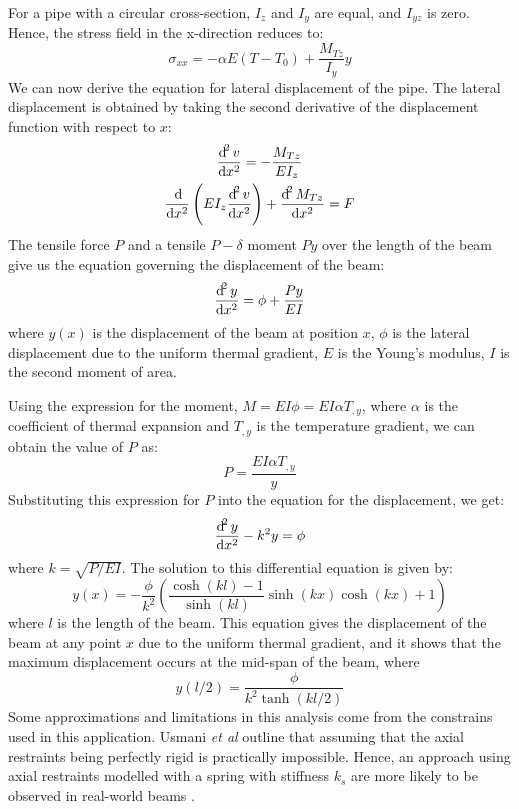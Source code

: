 For a pipe with a circular cross-section, $I_z$ and $I_y$ are equal, and $I_{yz}$ is zero. Hence, the stress field in the x-direction reduces to:
\begin{equation}
    \sigma_{xx} = -\alpha E \left(T - T_0\right) + \frac{M_{Tz}}{I_y}y
\end{equation}
We can now derive the equation for lateral displacement of the pipe. The lateral displacement is obtained by taking the second derivative of the displacement function with respect to $x$:
\begin{gather}
    \frac{\dif^2 v}{\dif x^2} = - \frac{M_{Tz}}{EI_z}\\
    \frac{\dif}{\dif x^2}\left(EI_z\frac{\dif^2 v}{\dif x^2}\right) + \frac{\dif^2 M_{Tz}}{\dif x^2} = F
\end{gather}
The tensile force $P$ and a tensile $P-\delta$ moment $Py$ over the length of the beam give us the equation governing the displacement of the beam:
\begin{equation}
    \frac{\dif^2 y}{\dif x^2} = \phi + \frac{Py}{EI}
\end{equation}
where $y(x)$ is the displacement of the beam at position $x$, $\phi$ is the lateral displacement due to the uniform thermal gradient, $E$ is the Young's modulus, $I$ is the second moment of area.

Using the expression for the moment, $M = EI \phi = EI\alpha T_{,y}$, where $\alpha$ is the coefficient of thermal expansion and $T_{,y}$ is the temperature gradient, we can obtain the value of $P$ as:
\begin{equation}
    P = \frac{EI\alpha T_{,y}}{y}
\end{equation}
Substituting this expression for $P$ into the equation for the displacement, we get:
\begin{equation}
    \frac{\dif^2 y}{\dif x^2} - k^2 y = \phi
\end{equation}
where $k = \sqrt{P/EI}$. The solution to this differential equation is given by:
\begin{equation}
    y(x) = -\frac{\phi}{k^2}\left(\frac{\cosh(kl) - 1}{\sinh(kl)}\sinh(kx)\cosh(kx)+1\right)
\end{equation}
where $l$ is the length of the beam. This equation gives the displacement of the beam at any point $x$ due to the uniform thermal gradient, and it shows that the maximum displacement occurs at the mid-span of the beam, where
\begin{equation}
    y(l/2) = \frac{\phi}{k^2 \tanh(kl/2)}
\end{equation}
Some approximations and limitations in this analysis come from the constrains used in this application. Usmani \textit{et al} outline that assuming that the axial restraints being perfectly rigid is practically impossible. Hence, an approach using axial restraints modelled with a spring with stiffness $k_s$ are more likely to be observed in real-world beams \cite{USMANI2001721}.
